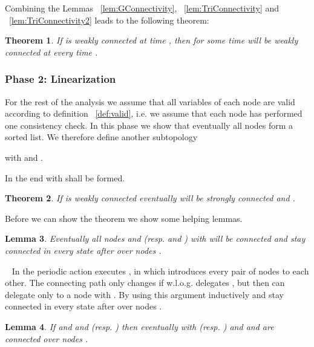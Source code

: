 \documentclass[11pt]{article}
\newtheorem{theorem}{Theorem}[section]
\newtheorem{lemma}[theorem]{Lemma}
\newcommand{\sq}{\hbox{\rlap{}}}
\newcommand{\qed}{\hspace*{\fill}\sq}
\newenvironment{proof}{\noindent {\bf Proof.}\ }{\qed\par\vskip 4mm\par}
\begin{document}
Combining the Lemmas ~\ref{lem:GConnectivity}, ~\ref{lem:TriConnectivity} and ~\ref{lem:TriConnectivity2} leads to the following theorem:
\begin{theorem}\label{theo:phase1}
If  is weakly connected at time , then for some time   will be weakly connected at every time .
\end{theorem}

\subsubsection{Phase 2: Linearization}
For the rest of the analysis we assume that all variables of each node are valid according to definition ~\ref{def:valid}, i.e. we assume that each node has performed one consistency check. In this phase we show that eventually all nodes form a sorted list. We therefore define another subtopology

 with  and .

In the end  with  shall be formed.

\begin{theorem}\label{theo:phase2}
If  is weakly connected eventually  will be strongly connected and .
\end{theorem}
 
Before we can show the theorem we show some helping lemmas.


\begin{lemma}\label{lem:RConnectivity}
Eventually all nodes  and  (resp.  and ) with  will be connected and stay connected in every state after over nodes .
\end{lemma}

\begin{proof}
In the periodic action  executes , in which  introduces every pair of nodes  to each other. The connecting path only changes if w.l.o.g.  delegates , but then  can delegate  only to a node  with . By using this argument inductively  and  stay connected in every state after over nodes .
\end{proof}

\begin{lemma}\label{lem:Forward}
If  and  and  (resp. ) then eventually  with  (resp. ) and  and  are connected over nodes .
\end{lemma}
\end{document}
